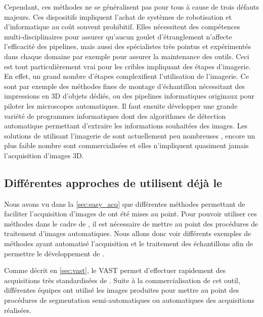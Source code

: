 \documentclass[\main/main.tex]{subfiles}
\begin{document}
%
Cependant, ces méthodes ne se généralisent pas pour tous à cause de trois défauts majeurs.
%
Ces dispositifs impliquent l'achat de systèmes de robotisation et d'informatique au coût souvent prohibitif. Elles nécessitent des compétences multi-disciplinaires pour assurer qu'aucun goulet d'étranglement n'affecte l'efficacité des pipelines, mais aussi des spécialistes très pointus et expérimentés dans chaque domaine par exemple pour assurer la maintenance des outils.
%
Ceci est tout particulièrement vrai pour les cribles impliquant des étapes d'imagerie.
%
En effet, un grand nombre d'étapes complexifient l'utilisation de l'imagerie. Ce sont par exemple des méthodes fines de montage d'échantillon nécessitant des impressions en 3D d'objets dédiés, ou des pipelines informatiques originaux pour piloter les microscopes automatiques. Il faut ensuite développer une grande variété de programmes informatiques dont des algorithmes de détection automatique permettant d'extraire les informations souhaitées des images.
%
Les solutions de \hcs{} utilisant l'imagerie de \pz{} sont actuellement peu nombreuses , encore un plus faible nombre sont commercialisées et elles n'impliquent quasiment jamais l'acquisition d'images 3D.
%
    \subsection{Différentes approches de \hcs{} utilisent déjà le \pz{}}

Nous avons vu dans la \autoref{sec:easy_acq} que différentes méthodes permettant de faciliter l'acquisition d'images de \pz{}
ont été mises au point.
%
Pour pouvoir utiliser ces méthodes dans le cadre de \hcs{}, il est nécessaire de mettre au point des procédures de traitement d'images automatiques.
%
Nous allons donc voir différents exemples de méthodes ayant automatisé l'acquisition et le traitement des échantillons afin de permettre le développement de \hcs{}.


%
Comme décrit en \autoref{sec:vast}, le VAST permet d'effectuer rapidement des acquisitions très standardisées de \pz{}.
%
Suite à la commercialisation de cet outil, différentes équipes ont utilisé les images produites pour mettre au point des procédures de segmentation semi-automatiques ou automatiques des acquisitions réalisées.
%
\end{document}
